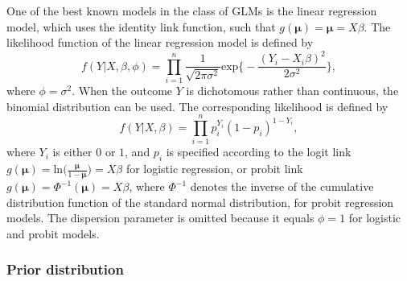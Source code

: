 \documentclass[
  authoryear,
  preprint,
  5p,
  twocolumn]{elsarticle}
\begin{document}
One of the best known models in the class of GLMs is the linear
regression model, which uses the identity link function, such that
\(g(\boldsymbol{\mu}) = \boldsymbol{\mu} = X\beta\). The likelihood
function of the linear regression model is defined by \[
f(Y | X, \beta, \phi) = \prod^n_{i=1} \frac{1}{\sqrt{2\pi\sigma^2}} \text{exp}
\Bigg\{
- \frac{(Y_i - X_i\beta)^2}{2\sigma^2}
\Bigg\},
\] where \(\phi = \sigma^2\). When the outcome \(Y\) is dichotomous
rather than continuous, the binomial distribution can be used. The
corresponding likelihood is defined by \[
f(Y|X, \beta) = \prod^n_{i=1} p_i^{Y_i} (1 - p_i)^{1 - Y_i},
\] where \(Y_i\) is either \(0\) or \(1\), and \(p_i\) is specified
according to the logit link
\(g(\boldsymbol{\mu}) = \text{ln}\Big(\frac{\boldsymbol{\mu}}{1 - \boldsymbol{\mu}}\Big) = X\beta\)
for logistic regression, or probit link
\(g(\boldsymbol{\mu}) = \Phi^{-1}(\boldsymbol{\mu}) = X\beta\), where
\(\Phi^{-1}\) denotes the inverse of the cumulative distribution
function of the standard normal distribution, for probit regression
models. The dispersion parameter is omitted because it equals
\(\phi = 1\) for logistic and probit models.

\hypertarget{prior-distribution}{%
\subsubsection{Prior distribution}\label{prior-distribution}}
\end{document}
